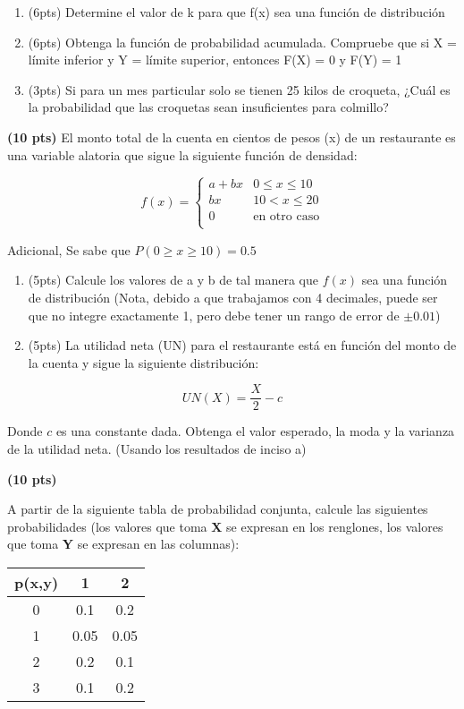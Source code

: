 \documentclass[addpoints]{exam}
\theoremstyle{mytheor}
\begin{document}
\begin{questions}
\begin{enumerate}[label=\Alph*)]
\item (6pts) Determine el valor de k para que f(x) sea una función de distribución
\item (6pts) Obtenga la función de probabilidad acumulada. Compruebe que si X = límite inferior y Y = límite superior, entonces F(X) = 0 y F(Y) = 1
\item (3pts) Si para un mes particular solo se tienen 25 kilos de croqueta, ¿Cuál es la probabilidad que las croquetas sean insuficientes para colmillo?
\end{enumerate}

\question \textbf{(10 pts)}
El monto total de la cuenta en cientos de pesos (x) de un restaurante es una variable alatoria que sigue la siguiente función de densidad:


\[   
f(x) = 
     \begin{cases}
       a+bx & 0 \leq x \leq 10\\
       bx & 10 < x \leq 20\\
       0 & \text{en otro caso} \\
     \end{cases}
\]

Adicional, Se sabe que $P(0 \geq x \geq 10) = 0.5$

\begin{enumerate}[label=\Alph*)]
\item (5pts) Calcule los valores de a y b de tal manera que $f(x)$ sea una función de distribución (Nota, debido a que trabajamos con 4 decimales, puede ser que no integre exactamente 1, pero debe tener un rango de error de $\pm 0.01$)
\item (5pts) La utilidad neta (UN) para el restaurante está en función del monto de la cuenta y sigue la siguiente distribución: 
\end{enumerate}
$$ UN(X) = \frac{X}{2}-c $$
 
Donde $c$ es una constante dada. Obtenga el valor esperado, la moda y la varianza de la utilidad neta. (Usando los resultados de inciso a)

\question \textbf{(10 pts)}

A partir de la siguiente tabla de probabilidad conjunta, calcule las siguientes probabilidades (los valores que toma \textbf{X} se expresan en los renglones, los valores que toma \textbf{Y} se expresan en las columnas):

\begin{center}
\begin{tabular}{ |c|c|c| } 
\hline
p(x,y) & 1 & 2 \\
\hline
0 & 0.1 & 0.2 \\
1 & 0.05 & 0.05 \\
2 & 0.2 & 0.1 \\
3 & 0.1 & 0.2  \\
\hline
\end{tabular}
\end{center}


\end{questions}
\end{document}
